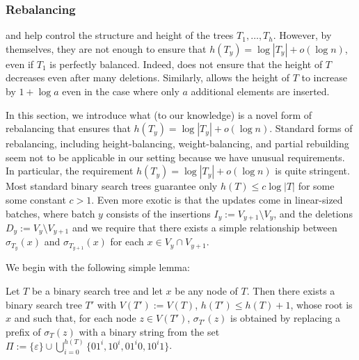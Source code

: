 \documentclass[kpfonts]{patmorin}
\begin{document}
\subsubsection{Rebalancing}

 and  help control the structure and height of the trees $T_1,\ldots,T_h$.  However, by themselves, they are not enough to ensure that $h(T_y)=\log|T_y|+o(\log n)$, even if $T_1$ is perfectly balanced.  Indeed,  does not ensure that the height of $T$ decreases even after many deletions.  Similarly,  allows the height of $T$ to increase by $1+\log a$ even in the case where only $a$ additional elements are inserted.  

In this section, we introduce what (to our knowledge) is a novel form of rebalancing that ensures that $h(T_y)=\log|T_y|+o(\log n)$.  Standard forms of rebalancing, including height-balancing, weight-balancing, and partial rebuilding seem not to be applicable in our setting because we have unusual requirements.  In particular, the requirement $h(T_y)=\log|T_y|+o(\log n)$ is quite stringent. Most standard binary search trees guarantee only $h(T)\le c\log |T|$ for some some constant $c>1$.  Even more exotic is that the updates come in linear-sized batches, where batch $y$ consists of the insertions $I_y:=V_{y+1}\setminus V_y$, and the deletions $D_y:=V_y\setminus V_{y+1}$ and we require that there exists a simple relationship between $\sigma_{T_y}(x)$ and $\sigma_{T_{y+1}}(x)$ for each $x\in V_y\cap V_{y+1}$.     

We begin with the following simple lemma:

\begin{lem}
  Let $T$ be a binary search tree and let $x$ be any node of $T$.  Then there exists a binary search tree $T'$ with $V(T'):=V(T)$,  $h(T')\le h(T)+1$,  whose root is $x$ and such that, for each node $z\in V(T')$, $\sigma_{T'}(z)$ is obtained by replacing a prefix of $\sigma_{T}(z)$ with a binary string from the set $\Pi:=\{\varepsilon\}\cup \bigcup_{i=0}^{h(T)}\{01^i, 10^i, 01^i0, 10^i1\}$.  
\end{lem}
\end{document}
